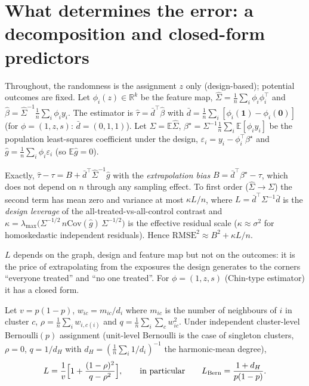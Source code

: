 \section{What determines the error: a decomposition and closed-form predictors}
\label{sec:theory}

Throughout, the randomness is the assignment $z$ only (design-based); potential outcomes are fixed. Let $\phi_i(z)\in\mathbb R^k$ be the feature map, $\hat\Sigma=\frac1n\sum_i\phi_i\phi_i^\top$ and $\hat\beta=\hat\Sigma^{-1}\frac1n\sum_i\phi_iy_i$. The estimator is $\hat\tau=\bar d^\top\hat\beta$ with $\bar d=\frac1n\sum_i[\phi_i(\mathbf 1)-\phi_i(\mathbf 0)]$ (for $\phi=(1,z,s)$: $\bar d=(0,1,1)$). Let $\Sigma=\mathbb E\hat\Sigma$, $\beta^\star=\Sigma^{-1}\frac1n\sum_i\mathbb E[\phi_iy_i]$ be the population least-squares coefficient under the design, $\varepsilon_i=y_i-\phi_i^\top\beta^\star$ and $\hat g=\frac1n\sum_i\phi_i\varepsilon_i$ (so $\mathbb E\hat g=0$).

\begin{proposition}[Decomposition]\label{prop:decomp}
Exactly, $\hat\tau-\tau=B+\bar d^\top\hat\Sigma^{-1}\hat g$ with the \emph{extrapolation bias} $B=\bar d^\top\beta^\star-\tau$, which does not depend on $n$ through any sampling effect. To first order ($\hat\Sigma\to\Sigma$) the second term has mean zero and variance at most $\kappa L/n$, where $L=\bar d^\top\Sigma^{-1}\bar d$ is the \emph{design leverage} of the all-treated-vs-all-control contrast and $\kappa=\lambda_{\max}\big(\Sigma^{-1/2}\,n\mathrm{Cov}(\hat g)\,\Sigma^{-1/2}\big)$ is the effective residual scale ($\kappa\approx\sigma^2$ for homoskedastic independent residuals). Hence $\mathrm{RMSE}^2\approx B^2+\kappa L/n$.
\end{proposition}

$L$ depends on the graph, design and feature map but not on the outcomes: it is the price of extrapolating from the exposures the design generates to the corners ``everyone treated'' and ``no one treated''. For $\phi=(1,z,s)$ (Chin-type estimator) it has a closed form.

\begin{proposition}\label{prop:lev}
Let $v=p(1-p)$, $w_{ic}=m_{ic}/d_i$ where $m_{ic}$ is the number of neighbours of $i$ in cluster $c$, $\rho=\frac1n\sum_i w_{i,c(i)}$ and $q=\frac1n\sum_i\sum_c w_{ic}^2$. Under independent cluster-level Bernoulli$(p)$ assignment (unit-level Bernoulli is the case of singleton clusters, $\rho=0$, $q=1/d_H$ with $d_H=(\frac1n\sum_i 1/d_i)^{-1}$ the harmonic-mean degree),
\[
L=\frac{1}{v}\Big[1+\frac{(1-\rho)^2}{q-\rho^2}\Big],\qquad\text{in particular}\qquad L_{\rm Bern}=\frac{1+d_H}{p(1-p)} .
\]
\end{proposition}

